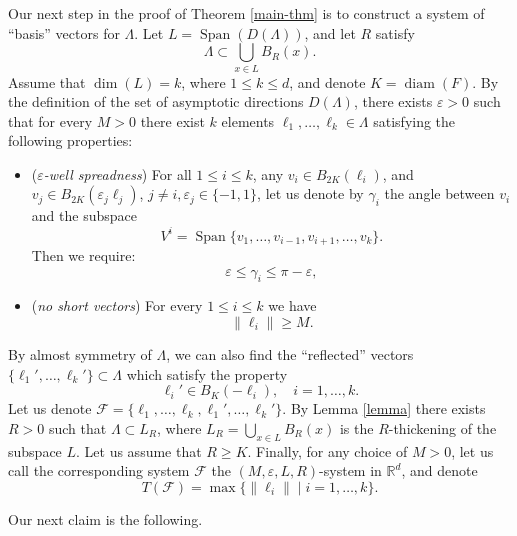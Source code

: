 \documentclass[JEP,XML,SOM,Unicode,NoEqCountersInSection]{cedram}
\DeclareMathOperator{\diam}{diam}
\DeclareMathOperator{\Span}{Span}
\newcommand{\cF}{\mathcal{F}}
\newcommand{\bR}{\mathbb{R}}
\let\eps\varepsilon
\theoremstyle{plain}
\theoremstyle{definition}
\begin{document}
Our next step in the proof of Theorem \ref{main-thm} is to construct a system of ``basis'' vectors for $\Lambda$. Let $L = \Span(D(\Lambda))$, and let $R$ satisfy
\begin{equation}\label{R-thick}
\Lambda \subset \bigcup_{x \in L} B_{R}(x).
\end{equation}
Assume that $\dim(L) = k$, where $1 \le k \le d$, and denote $K = \diam(F)$. By the definition of the set of asymptotic directions $D(\Lambda)$, there exists $\eps > 0$ such that for every $M > 0$ there exist $k$ elements $\ell_1,\ldots,\ell_k \in \Lambda$ satisfying the following properties:

\begin{itemize}
\item{(\textit{$\eps$-well spreadness})}
For all $1 \le i \le k$, any $v_i \in B_{2K}(\ell_i)$, and $v_j \in B_{2K}(\varepsilon_j\ell_j)$, $j \neq i, \varepsilon_j \in \{-1,1\}$, let us denote by $\gamma_i$ the angle between $v_i$ and the subspace
\[
V^i = \Span\{v_1,\ldots,v_{i-1},v_{i+1},\ldots,v_k\}.
\]
Then we require:
\[
\eps \le \gamma_i \le \pi - \eps,
\]

\item{(\textit{no short vectors})} For every $1 \le i \le k$ we have
\[
\| \ell_i \| \ge M.
\]
\end{itemize}
By almost symmetry of $\Lambda$, we can also find the ``reflected'' vectors $\{\ell_1',\ldots,\ell_k'\} \subset \Lambda$ which satisfy the property
\[
\ell_i' \in B_K(-\ell_i),\quad i=1,\ldots,k.
\]
Let us denote $\cF = \{\ell_1,\ldots,\ell_k, \ell_1',\ldots,\ell_k'\}$. By Lemma \ref{lemma} there exists $R > 0$ such that $\Lambda \subset L_R$, where
$L_R = \bigcup_{x \in L} B_R(x)$ is the $R$-thickening of the subspace $L$. Let us assume that $R \ge K$.
Finally, for any choice of $M > 0$, let us call the corresponding system $\cF$ the $(M,\eps,L,R)$-system in $\bR^d$, and denote $$T(\cF) = \max\{ \| \ell_i \| \mid i=1,\ldots,k \}.$$

Our next claim is the following.
\end{document}

